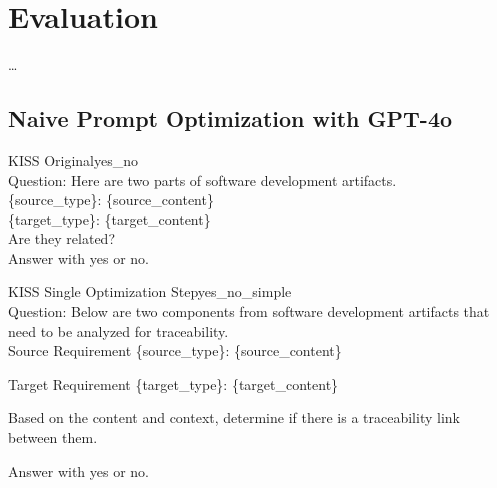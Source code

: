 
\chapter{Evaluation}
\label{ch:Evaluation}

\dots

\section{Naive Prompt Optimization with GPT-4o}
\label{sec:Evaluation:FirstSection}

\begin{prompt}{KISS Original}{yes_no}\\
    Question: Here are two parts of software development artifacts.\\
    \{source\_type\}: \textquotesingle{}\textquotesingle{}\textquotesingle{}\{source\_content\}\textquotesingle{}\textquotesingle{}\textquotesingle{}\\
    \{target\_type\}: \textquotesingle{}\textquotesingle{}\textquotesingle{}\{target\_content\}\textquotesingle{}\textquotesingle{}\textquotesingle{}\\
    Are they related?\\
    Answer with \textquotesingle{}yes\textquotesingle{} or \textquotesingle{}no\textquotesingle{}.
\end{prompt}

\begin{prompt}{KISS Single Optimization Step}{yes_no_simple}\\
    Question: Below are two components from software development artifacts that need to be analyzed for traceability.\\

            Source Requirement \{source\_type\}: \textquotesingle{}\textquotesingle{}\textquotesingle{}\{source\_content\}\textquotesingle{}\textquotesingle{}\textquotesingle{}

            Target Requirement \{target\_type\}: \textquotesingle{}\textquotesingle{}\textquotesingle{}\{target\_content\}\textquotesingle{}\textquotesingle{}\textquotesingle{}
            
            Based on the content and context, determine if there is a traceability link between them.

            Answer with \textquotesingle{}yes\textquotesingle{} or \textquotesingle{}no\textquotesingle{}.
    
\end{prompt}

